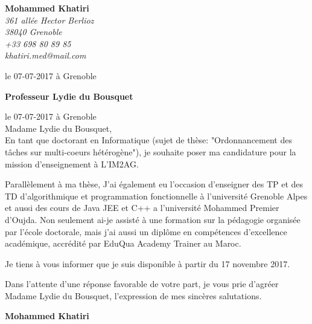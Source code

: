 \documentclass[11pt]{letter}
\begin{document}
 \sffamily
 \hfill
 \begin{flushleft}
 {\bfseries Mohammed Khatiri}\\[.35ex]
 \small\itshape
 361 allée Hector Berlioz\\
 38040 Grenoble\\[.35ex]
 +33 698 80 89 85\\
 khatiri.med@mail.com
 \end{flushleft}
 \begin{flushright}
  le 07-07-2017 à Grenoble\\
 \end{flushright}


 \begin{flushright}
 {\bfseries Professeur Lydie du Bousquet}\\[.35ex]
     \small\itshape
 \end{flushright}
  le 07-07-2017 à Grenoble\\
 \bigskip
 \bigskip
 \bigskip
  Madame Lydie du Bousquet,\\

 En tant que doctorant en Informatique (sujet de thèse: "Ordonnancement des tâches sur multi-coeurs hétérogène"),
 je souhaite poser ma candidature pour la mission d'enseignement à L'IM2AG. 

Parallèlement à ma thèse,
J’ai également eu l’occasion d'enseigner des TP et des TD d'algorithmique et
programmation fonctionnelle à l'université Grenoble Alpes
et aussi des cours de Java JEE et C++ a l'université Mohammed Premier d'Oujda.
Non seulement ai-je assisté à une formation sur la pédagogie organisée par l'école doctorale,
mais j'ai aussi un diplôme en compétences d’excellence académique, accrédité par EduQua Academy Trainer au Maroc.

Je tiens à vous informer que je suis disponible à partir du 17 novembre 2017.

Dans l'attente d'une réponse favorable de votre part, je vous prie d'agréer Madame Lydie du Bousquet, l'expression de mes sincères salutations.\\


 \begin{center}
 {\bfseries Mohammed Khatiri}\\
 \end{center}
 \vfill
 
\end{document}
